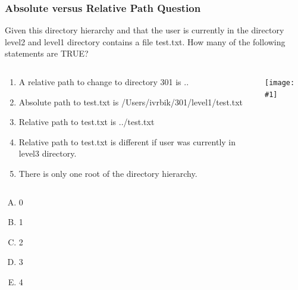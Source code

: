 \documentclass[xcolor=svgnames, colorlinks, handout]{beamer}
\newcommand{\ipic}[2]{\texttt{[image: \#1]}}
\newcommand{\ft}[1]{\frametitle{#1}}
\begin{document}




\begin{frame}\ft{Absolute versus Relative Path Question}
  \begin{example}
Given this directory hierarchy and that the user is currently in the directory level2 and level1 directory contains a file test.txt. How many of the following statements are TRUE?
\begin{columns}[T] %
\begin{column}{.7\textwidth}
\begin{enumerate}
\item A relative path to change to directory 301 is ..
\item Absolute path to test.txt is /Users/ivrbik/301/level1/test.txt
\item Relative path to test.txt is ../test.txt
\item Relative path to test.txt is different if user was currently in level3 directory.
\item {There is only one root of the directory hierarchy.}
\end{enumerate}
\end{column}%
\hfill%
\begin{column}{.1\textwidth}
\hspace*{-1in}
\vspace*{-1in}
\ipic{relativepath}{4.5}
\end{column}%
\end{columns}
\begin{multicols}{7}
\begin{enumerate}[A)]
\item 0 
\item 1
\item 2
\item 3
\item 4
\end{enumerate}
\end{multicols}
  \end{example} 
\end{frame}
\end{document}
